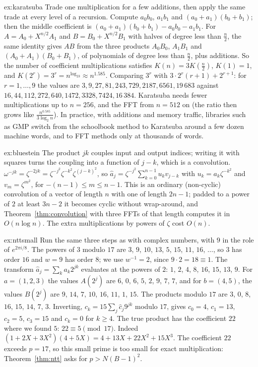 \begin{solution}{ex:karatsuba}
\idea Trade one multiplication for a few additions, then apply the same trade at every level of a recursion.
\writeup Compute $a_0b_0$, $a_1b_1$ and $(a_0+a_1)(b_0+b_1)$; then the middle coefficient is $(a_0+a_1)(b_0+b_1)-a_0b_0-a_1b_1$. For $A=A_0+X^{n/2}A_1$
and $B=B_0+X^{n/2}B_1$ with halves of degree less than $\frac n2$, the same identity gives $AB$ from the three products $A_0B_0$,
$A_1B_1$ and $(A_0+A_1)(B_0+B_1)$, of polynomials of degree less than $\frac n2$, plus additions. So the number of coefficient
multiplications satisfies $K(n)=3K(\frac n2)$, $K(1)=1$, and $K(2^r)=3^r=n^{\log_23}\approx n^{1.585}$. Comparing $3^r$ with $3\cdot2^r(r+1)+2^{r+1}$: for $r=1,\dots,9$
the values are $3,9,27,81,243,729,2187,6561,19\,683$ against $16,44,112,272,640,1472,3328,7424,16\,384$. Karatsuba needs fewer
multiplications up to $n=256$, and the FFT from $n=512$ on (the ratio then grows like $\frac{n^{0.585}}{3\log_2n}$). In
practice, with additions and memory traffic, libraries such as GMP switch from the schoolbook method to Karatsuba around a few
dozen machine words, and to FFT methods only at thousands of words.
\end{solution}

\begin{solution}{ex:bluestein}
\idea The product $jk$ couples input and output indices; writing it with squares turns the coupling into a function of
$j-k$, which is a convolution.
\writeup $\omega^{-jk}=\zeta^{-2jk}=\zeta^{-j^2}\zeta^{-k^2}\zeta^{(j-k)^2}$, so $\hat a_j=\zeta^{-j^2}\sum_{k=0}^{n-1}u_kv_{j-k}$ with $u_k=a_k\zeta^{-k^2}$ and $v_m=\zeta^{m^2}$, for
$-(n-1)\le m\le n-1$. This is an ordinary (non-cyclic) convolution of a vector of length $n$ with one of length $2n-1$; padded to a power
of $2$ at least $3n-2$ it becomes cyclic without wrap-around, and Theorem~\ref{thm:convolution} with three FFTs of that length computes
it in $O(n\log n)$. The extra multiplications by powers of $\zeta$ cost $O(n)$.
\end{solution}

\begin{solution}{ex:nttsmall}
\idea Run the same three steps as with complex numbers, with $9$ in the role of $e^{2\pi i/8}$.
\writeup The powers of $3$ modulo $17$ are $3$, $9$, $10$, $13$, $5$, $15$, $11$, $16$, $\dots$, so $3$ has order $16$ and $w=9$ has order $8$; we use $w^{-1}=2$, since
$9\cdot2=18\equiv1$. The transform $\hat a_j=\sum_ka_k2^{jk}$ evaluates at the powers of $2$: $1$, $2$, $4$, $8$, $16$, $15$, $13$, $9$. For $a=(1,2,3)$ the values
$A(2^j)$ are $6$, $0$, $6$, $5$, $2$, $9$, $7$, $7$, and for $b=(4,5)$, the values $B(2^j)$ are $9$, $14$, $7$, $10$, $16$, $11$, $1$, $15$. The products modulo $17$ are $3$, $0$, $8$, $16$, $15$, $14$, $7$, $3$.
Inverting, $c_k=15\sum_j\hat c_j9^{jk}$ modulo $17$, gives $c_0=4$, $c_1=13$, $c_2=5$, $c_3=15$ and $c_k=0$ for $k\ge4$. The true product has the coefficient $22$ where we
found $5$: $22\equiv5\pmod{17}$. Indeed $(1+2X+3X^2)(4+5X)=4+13X+22X^2+15X^3$. The coefficient $22$ exceeds $p=17$, so this
small prime is too small for exact multiplication: Theorem~\ref{thm:ntt} asks for $p>N(B-1)^2$.
\end{solution}

